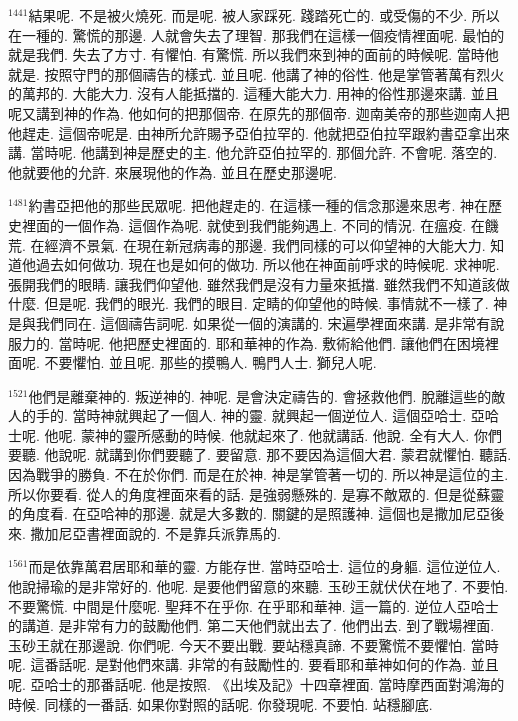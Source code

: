 \documentclass{book}
\begin{document}
$^{1441}$結果呢.
不是被火燒死.
而是呢.
被人家踩死.
踐踏死亡的.
或受傷的不少.
所以在一種的.
驚慌的那邊.
人就會失去了理智.
那我們在這樣一個疫情裡面呢.
最怕的就是我們.
失去了方寸.
有懼怕.
有驚慌.
所以我們來到神的面前的時候呢.
當時他就是.
按照守門的那個禱告的樣式.
並且呢.
他講了神的俗性.
他是掌管著萬有烈火的萬邦的.
大能大力.
沒有人能抵擋的.
這種大能大力.
用神的俗性那邊來講.
並且呢又講到神的作為.
他如何的把那個帝.
在原先的那個帝.
迦南美帝的那些迦南人把他趕走.
這個帝呢是.
由神所允許賜予亞伯拉罕的.
他就把亞伯拉罕跟約書亞拿出來講.
當時呢.
他講到神是歷史的主.
他允許亞伯拉罕的.
那個允許.
不會呢.
落空的.
他就要他的允許.
來展現他的作為.
並且在歷史那邊呢.

$^{1481}$約書亞把他的那些民眾呢.
把他趕走的.
在這樣一種的信念那邊來思考.
神在歷史裡面的一個作為.
這個作為呢.
就使到我們能夠遇上.
不同的情況.
在瘟疫.
在饑荒.
在經濟不景氣.
在現在新冠病毒的那邊.
我們同樣的可以仰望神的大能大力.
知道他過去如何做功.
現在也是如何的做功.
所以他在神面前呼求的時候呢.
求神呢.
張開我們的眼睛.
讓我們仰望他.
雖然我們是沒有力量來抵擋.
雖然我們不知道該做什麼.
但是呢.
我們的眼光.
我們的眼目.
定睛的仰望他的時候.
事情就不一樣了.
神是與我們同在.
這個禱告詞呢.
如果從一個的演講的.
宋遍學裡面來講.
是非常有說服力的.
當時呢.
他把歷史裡面的.
耶和華神的作為.
敷術給他們.
讓他們在困境裡面呢.
不要懼怕.
並且呢.
那些的摸鴨人.
鴨門人士.
獅兒人呢.

$^{1521}$他們是離棄神的.
叛逆神的.
神呢.
是會決定禱告的.
會拯救他們.
脫離這些的敵人的手的.
當時神就興起了一個人.
神的靈.
就興起一個逆位人.
這個亞哈士.
亞哈士呢.
他呢.
蒙神的靈所感動的時候.
他就起來了.
他就講話.
他說.
全有大人.
你們要聽.
他說呢.
就講到你們要聽了.
要留意.
那不要因為這個大君.
蒙君就懼怕.
聽話.
因為戰爭的勝負.
不在於你們.
而是在於神.
神是掌管著一切的.
所以神是這位的主.
所以你要看.
從人的角度裡面來看的話.
是強弱懸殊的.
是寡不敵眾的.
但是從蘇靈的角度看.
在亞哈神的那邊.
就是大多數的.
關鍵的是照護神.
這個也是撒加尼亞後來.
撒加尼亞書裡面說的.
不是靠兵派靠馬的.

$^{1561}$而是依靠萬君居耶和華的靈.
方能存世.
當時亞哈士.
這位的身軀.
這位逆位人.
他說掃瑜的是非常好的.
他呢.
是要他們留意的來聽.
玉砂王就伏伏在地了.
不要怕.
不要驚慌.
中間是什麼呢.
聖拜不在乎你.
在乎耶和華神.
這一篇的.
逆位人亞哈士的講道.
是非常有力的鼓勵他們.
第二天他們就出去了.
他們出去.
到了戰場裡面.
玉砂王就在那邊說.
你們呢.
今天不要出戰.
要站穩真諦.
不要驚慌不要懼怕.
當時呢.
這番話呢.
是對他們來講.
非常的有鼓勵性的.
要看耶和華神如何的作為.
並且呢.
亞哈士的那番話呢.
他是按照.
《出埃及記》十四章裡面.
當時摩西面對鴻海的時候.
同樣的一番話.
如果你對照的話呢.
你發現呢.
不要怕.
站穩腳底.
\end{document}

